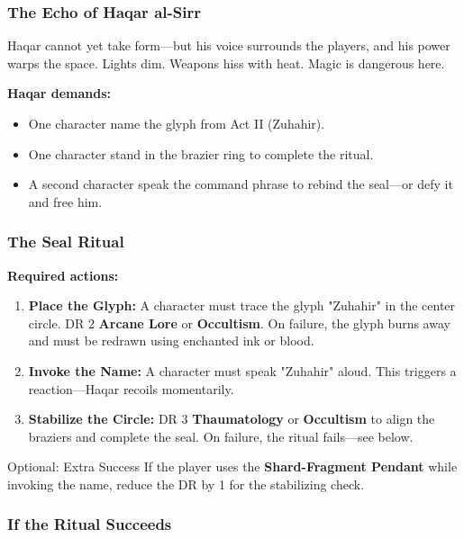 \subsubsection*{The Echo of Haqar al-Sirr}

Haqar cannot yet take form—but his voice surrounds the players, and his power warps the space. Lights dim. Weapons hiss with heat. Magic is dangerous here.

\textbf{Haqar demands:}  
\begin{itemize}\raggedright
    \item One character name the glyph from Act II (Zuhahir).
    \item One character stand in the brazier ring to complete the ritual.
    \item A second character speak the command phrase to rebind the seal—or defy it and free him.
\end{itemize}

\subsubsection*{The Seal Ritual}

\textbf{Required actions:}

\begin{enumerate}\raggedright
    \item \textbf{Place the Glyph:} A character must trace the glyph "Zuhahir" in the center circle. DR 2 \textbf{Arcane Lore} or \textbf{Occultism}. On failure, the glyph burns away and must be redrawn using enchanted ink or blood.
    
    \item \textbf{Invoke the Name:} A character must speak "Zuhahir" aloud. This triggers a reaction—Haqar recoils momentarily.

    \item \textbf{Stabilize the Circle:} DR 3 \textbf{Thaumatology} or \textbf{Occultism} to align the braziers and complete the seal. On failure, the ritual fails—see below.
\end{enumerate}

\begin{CommentBox}{Optional: Extra Success}
    If the player uses the \textbf{Shard-Fragment Pendant} while invoking the name, reduce the DR by 1 for the stabilizing check.
\end{CommentBox}

\subsubsection*{If the Ritual Succeeds}

